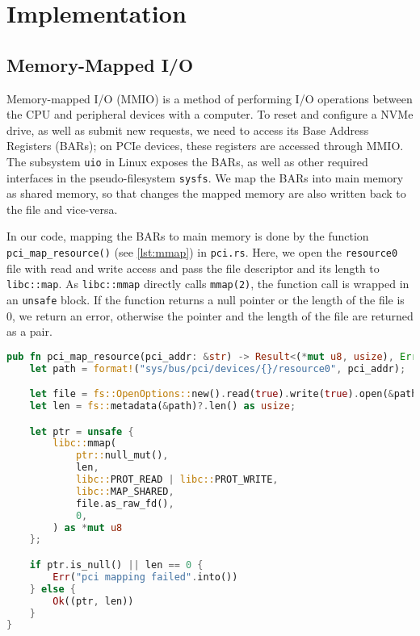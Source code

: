 \chapter{Implementation}\label{chapter:implementation}
\section{Memory-Mapped I/O}\label{section:MMIO}
Memory-mapped I/O (MMIO) is a method of performing I/O operations between the CPU and peripheral devices with a computer. To reset and configure a NVMe drive, as well as submit new requests, we need to access its Base Address Registers (BARs); on PCIe devices, these registers are accessed through MMIO. The subsystem \texttt{uio} in Linux exposes the BARs, as well as other required interfaces in the pseudo-filesystem \texttt{sysfs}. We map the BARs into main memory as shared memory, so that changes the mapped memory are also written back to the file and vice-versa.

In our code, mapping the BARs to main memory is done by the function \texttt{pci\_map\_resource()} (see \ref{lst:mmap}) in \texttt{pci.rs}. Here, we open the \texttt{resource0} file with read and write access and pass the file descriptor and its length to \texttt{libc::map}. As \texttt{libc::mmap} directly calls \texttt{mmap(2)}, the function call is wrapped in an \texttt{unsafe} block. If the function returns a null pointer or the length of the file is 0, we return an error, otherwise the pointer and the length of the file are returned as a pair.

\begin{lstlisting}[float, language=Rust,label=lst:mmap,caption=Memory mapping a PCI resource in Rust]
pub fn pci_map_resource(pci_addr: &str) -> Result<(*mut u8, usize), Error> {
    let path = format!("sys/bus/pci/devices/{}/resource0", pci_addr);

    let file = fs::OpenOptions::new().read(true).write(true).open(&path)?;
    let len = fs::metadata(&path)?.len() as usize;

    let ptr = unsafe {
        libc::mmap(
            ptr::null_mut(),
            len,
            libc::PROT_READ | libc::PROT_WRITE,
            libc::MAP_SHARED,
            file.as_raw_fd(),
            0,
        ) as *mut u8
    };

    if ptr.is_null() || len == 0 {
        Err("pci mapping failed".into())
    } else {
        Ok((ptr, len))
    }
}
\end{lstlisting}

